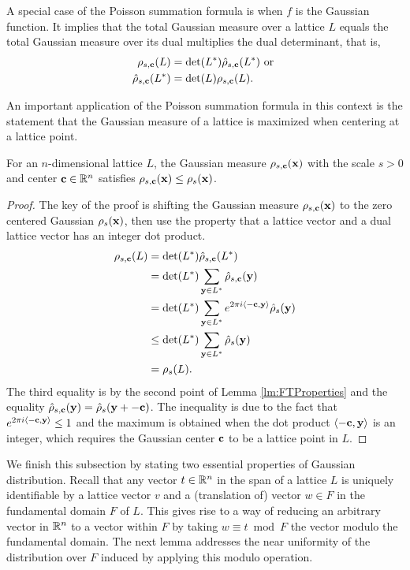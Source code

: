 \documentclass[../main.tex]{subfiles}
\begin{document}
A special case of the Poisson summation formula is when  $f$ is the Gaussian function. It implies that the total Gaussian measure over a lattice $L$ equals the total Gaussian measure over its dual multiplies the dual determinant, that is, 
\begin{align*}
    \rho_{s,\mathbf{c}}(L) &= \det(L^*) \hat{\rho}_{s,\mathbf{c}}(L^*) \text{ or } \\
    \hat{\rho}_{s,\mathbf{c}}(L^*) &= \det(L) \rho_{s,\mathbf{c}}(L).
\end{align*}

An important application of the Poisson summation formula in this context is the statement that the Gaussian measure of a lattice is maximized when centering at a lattice point. 

\begin{lemma}
For an $n$-dimensional lattice $L$, the Gaussian measure $\rho_{s,\mathbf{c}}(\mathbf{x})$ with the scale $s > 0$ and center $\mathbf{c} \in \mathbb{R}^n$ satisfies $\rho_{s,\mathbf{c}}(\mathbf{x}) \le \rho_s(\mathbf{x})$.
\end{lemma}
\begin{proof}
The key of the proof is shifting the Gaussian measure $\rho_{s,\mathbf{c}}(\mathbf{x})$ to the zero centered Gaussian $\rho_s(\mathbf{x})$, then use the property that a lattice vector and a dual lattice vector has an integer dot product. 
\begin{align*}
    \rho_{s,\mathbf{c}}(L) &= \det(L^*) \hat{\rho}_{s,\mathbf{c}}(L^*) \\
    &= \det(L^*) \sum_{\mathbf{y} \in L^*} \hat{\rho}_{s,\mathbf{c}}(\mathbf{y}) \\
    &= \det(L^*) \sum_{\mathbf{y} \in L^*} e^{2\pi i\langle -\mathbf{c},\mathbf{y} \rangle} \hat{\rho}_{s}(\mathbf{y}) \\
    &\le \det(L^*) \sum_{\mathbf{y} \in L^*} \hat{\rho}_{s}(\mathbf{y}) \\
    &= \rho_s(L).
\end{align*}
The third equality is by the second point of Lemma \ref{lm:FTProperties} and the equality $\hat{\rho}_{s,\mathbf{c}}(\mathbf{y})=\hat{\rho}_s(\mathbf{y}+\mathbf{-c})$. The inequality is due to the fact that $e^{2\pi i\langle -\mathbf{c},\mathbf{y} \rangle} \le 1$ and the maximum is obtained when the dot product $\langle \mathbf{-c}, \mathbf{y}\rangle$ is an integer, which requires the Gaussian center $\mathbf{c}$ to be a lattice point in $L$.
\end{proof}

We finish this subsection by stating two essential properties of Gaussian distribution. Recall that any vector $t \in \mathbb{R}^n$ in the span of a lattice $L$ is uniquely identifiable by a lattice vector $v$ and a (translation of) vector $w \in F$ in the fundamental domain $F$ of $L$. This gives rise to a way of reducing an arbitrary vector in $\mathbb{R}^n$ to a vector within $F$ by taking $w \equiv t \bmod F$ the vector modulo the fundamental domain. The next lemma addresses the near uniformity of the distribution over $F$ induced by applying this modulo operation. 
\end{document}
